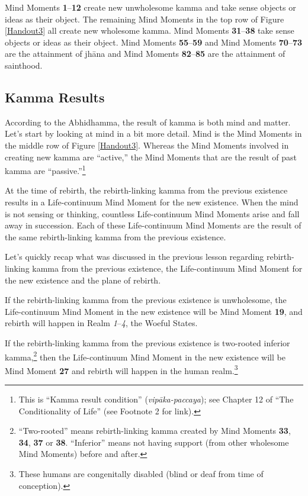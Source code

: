 Mind Moments \textbf{1}--\textbf{12} create new unwholesome kamma and take sense objects or ideas as their object. The remaining Mind Moments in the top row of Figure \ref{Handout3} all create new wholesome kamma. Mind Moments \textbf{31}--\textbf{38} take sense objects or ideas as their object. Mind Moments \textbf{55}--\textbf{59} and Mind Moments \textbf{70}--\textbf{73} are the attainment of jhāna and Mind Moments \textbf{82}--\textbf{85} are the attainment of sainthood.

\subsection*{Kamma Results}

According to the Abhidhamma, the result of kamma is both mind and matter. Let’s start by looking at mind in a bit more detail. Mind is the Mind Moments in the middle row of Figure \ref{Handout3}. Whereas the Mind Moments involved in creating new kamma are “active,” the Mind Moments that are the result of past kamma are “passive.”\footnote{This is “Kamma result condition” (\textit{vipāka-paccaya}); see Chapter 12 of “The Conditionality of Life” (see Footnote 2 for link).}

At the time of rebirth, the rebirth-linking kamma from the previous existence results in a Life-continuum Mind Moment for the new existence. When the mind is not sensing or thinking, countless Life-continuum Mind Moments arise and fall away in succession. Each of these Life-continuum Mind Moments are the result of the same rebirth-linking kamma from the previous existence.

Let’s quickly recap what was discussed in the previous lesson regarding rebirth-linking kamma from the previous existence, the Life-continuum Mind Moment for the new existence and the plane of rebirth.

If the rebirth-linking kamma from the previous existence is unwholesome, the Life-continuum Mind Moment in the new existence will be Mind Moment \textbf{19}, and rebirth will happen in Realm \textit{1}--\textit{4}, the Woeful States. 

If the rebirth-linking kamma from the previous existence is two-rooted inferior kamma,\footnote{“Two-rooted” means rebirth-linking kamma created by Mind Moments \textbf{33}, \textbf{34}, \textbf{37} or \textbf{38}. “Inferior” means not having support (from other wholesome Mind Moments) before and after.} then the Life-continuum Mind Moment in the new existence will be Mind Moment \textbf{27} and rebirth will happen in the human realm.\footnote{These humans are congenitally disabled (blind or deaf from time of conception).}

